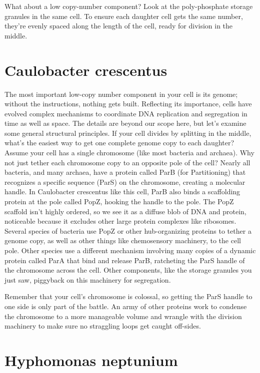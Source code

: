\documentclass[]{tufte-book}
\begin{document}
What about a low copy-number component? Look at the poly-phosphate
storage granules in the same cell. To ensure each daughter cell gets the
same number, they're evenly spaced along the length of the cell, ready
for division in the middle.

\section{Caulobacter crescentus}\label{caulobacter-crescentus-3}

The most important low-copy number component in your cell is its genome;
without the instructions, nothing gets built. Reflecting its importance,
cells have evolved complex mechanisms to coordinate DNA replication and
segregation in time as well as space. The details are beyond our scope
here, but let's examine some general structural principles. If your cell
divides by splitting in the middle, what's the easiest way to get one
complete genome copy to each daughter? Assume your cell has a single
chromosome (like most bacteria and archaea). Why not just tether each
chromosome copy to an opposite pole of the cell? Nearly all bacteria,
and many archaea, have a protein called ParB (for Partitioning) that
recognizes a specific sequence (ParS) on the chromosome, creating a
molecular handle. In Caulobacter crescentus like this cell, ParB also
binds a scaffolding protein at the pole called PopZ, hooking the handle
to the pole. The PopZ scaffold isn't highly ordered, so we see it as a
diffuse blob of DNA and protein, noticeable because it excludes other
large protein complexes like ribosomes. Several species of bacteria use
PopZ or other hub-organizing proteins to tether a genome copy, as well
as other things like chemosensory machinery, to the cell pole. Other
species use a different mechanism involving many copies of a dynamic
protein called ParA that bind and release ParB, ratcheting the ParS
handle of the chromosome across the cell. Other components, like the
storage granules you just saw, piggyback on this machinery for
segregation.

Remember that your cell's chromosome is colossal, so getting the ParS
handle to one side is only part of the battle. An army of other proteins
work to condense the chromosome to a more manageable volume and wrangle
with the division machinery to make sure no straggling loops get caught
off-sides.

\section{Hyphomonas neptunium}\label{hyphomonas-neptunium}
\end{document}
